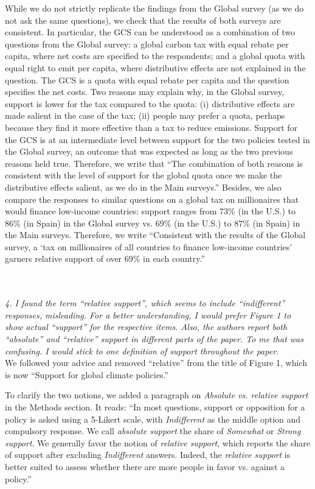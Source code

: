 \documentclass[12pt,english]{article}
\begin{document}
While we do not strictly replicate the findings from the Global survey (as we do not ask the same questions), we check that the results of both surveys are consistent. In particular, the GCS can be understood as a combination of two questions from the Global survey: a global carbon tax with equal rebate per capita, where net costs are specified to the respondents; and a global quota with equal right to emit per capita, where distributive effects are not explained in the question. The GCS is a quota with equal rebate per capita and the question specifies the net costs. Two reasons may explain why, in the Global survey, support is lower for the tax compared to the quota: (i) distributive effects are made salient in the case of the tax; (ii) people may prefer a quota, perhaps because they find it more effective than a tax to reduce emissions. Support for the GCS is at an intermediate level between support for the two policies tested in the Global survey, an outcome that was expected as long as the two previous reasons held true. Therefore, we write that ``The combination of both reasons is consistent with the level of support for the global quota once we make the distributive effects salient, as we do in the Main surveys.'' Besides, we also compare the responses to similar questions on a global tax on millionaires that would finance low-income countries: support ranges from 73\% (in the U.S.) to 86\% (in Spain) in the Global survey vs. 69\% (in the U.S.) to 87\% (in Spain) in the Main surveys. Therefore, we write ``Consistent with the results of the Global survey, a `tax on millionaires of all countries to finance low-income countries' garners relative support of over 69\% in each country.''

~\\ ~\\

\textit{4. I found the term “relative support”, which seems to include “indifferent” responses, misleading. For a better understanding, I would prefer Figure 1 to show actual “support” for the respective items. Also, the authors report both “absolute” and “relative” support in different parts of the paper. To me that was confusing. I would stick to one definition of support throughout the paper.}~\\

We followed your advice and removed ``relative'' from the title of Figure 1, which is now ``Support for global climate policies.''

To clarify the two notions, we added a paragraph on \textit{Absolute vs. relative support} in the Methods section. It reads: ``In most questions, support or opposition for a policy is asked using a 5-Likert scale, with \textit{Indifferent} as the middle option and compulsory response. We call \textit{absolute support} the share of \textit{Somewhat} or \textit{Strong support}. We generally favor the notion of \textit{relative support}, which reports the share of support after excluding \textit{Indifferent} answers. Indeed, the \textit{relative support} is better suited to assess whether there are more people in favor vs. against a policy.''
\end{document}

